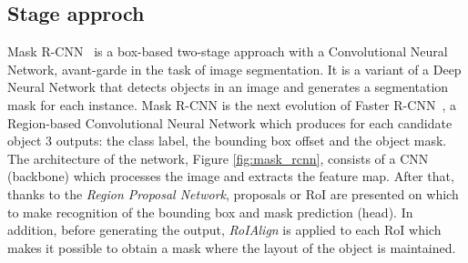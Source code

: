 \documentclass[10pt,twocolumn,letterpaper]{article}
\begin{document}
\subsection{Stage approch} 
Mask R-CNN~\cite{Authors1_maskrcnn} is a box-based two-stage approach with a Convolutional Neural Network, avant-garde in the task of image segmentation. It is a variant of a Deep Neural Network that detects objects in an image and generates a segmentation mask for each instance. Mask R-CNN is the next evolution of Faster R-CNN~\cite{fasterRCNN}, a Region-based Convolutional Neural Network which produces for each candidate object 3 outputs: the class label, the bounding box offset and the object mask.
The architecture of the network, Figure \ref{fig:mask_rcnn}, consists of a CNN (backbone) which processes the image and extracts the feature map. After that, thanks to the \textit{Region Proposal Network}, proposals or RoI are presented on which to make recognition of the bounding box and mask prediction (head). In addition, before generating the output, \textit{RoIAlign} is applied to each RoI which makes it possible to obtain a mask where the layout of the object is maintained.
\end{document}
